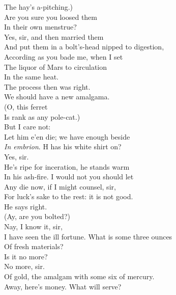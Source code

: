 \documentclass[a4paper,oneside,12pt]{memoir}
\begin{document}
\begin{drama*}
The hay's a-pitching.)\\
\subtlespeaks {} Are you sure you loosed them\\
In their own menstrue?\\
\facespeaks {} Yes, sir, and then married them\\
And put them in a bolt's-head nipped to digestion,\\
According as you bade me, when I set\\
The liquor of Mars to circulation\\
In the same heat.\\
\subtlespeaks {} The process then was right.\\
We should have a new amalgama.\\
\surlyspeaks {} (O, this ferret\\
Is rank as any pole-cat.)\\
\subtlespeaks {} But I care not:\\
Let him e'en die; we have enough beside\\
\emph{In embrion}. H has his white shirt on?\\
\facespeaks {} Yes, sir.\\
He's ripe for inceration, he stands warm\\
In his ash-fire. I would not you should let\\
Any die now, if I might counsel, sir,\\
For luck's sake to the rest: it is not good.\\
\mammonspeaks He says right.\\
\surlyspeaks {} (Ay, are you bolted?)\\
\facespeaks {} Nay, I know it, sir,\\
I have seen the ill fortune. What is some three ounces\\
Of fresh materials?\\
\mammonspeaks {} Is it no more?\\
\facespeaks {} No more, sir.\\
Of gold, the amalgam with some six of mercury.\\
\mammonspeaks Away, here's money. What will serve?\\

\end{drama*}
\end{document}
